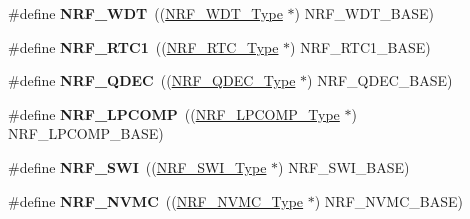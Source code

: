 \begin{DoxyCompactItemize}
\item 
\hypertarget{group___device___peripheral___registers_gae8afcbbf324cec8716a38d24de6b9220}{}\#define {\bfseries N\+R\+F\+\_\+\+W\+D\+T}~((\hyperlink{struct_n_r_f___w_d_t___type}{N\+R\+F\+\_\+\+W\+D\+T\+\_\+\+Type}            $\ast$) N\+R\+F\+\_\+\+W\+D\+T\+\_\+\+B\+A\+S\+E)\label{group___device___peripheral___registers_gae8afcbbf324cec8716a38d24de6b9220}

\item 
\hypertarget{group___device___peripheral___registers_ga5d5a8d82ac2dea6f34f24e3c01345a80}{}\#define {\bfseries N\+R\+F\+\_\+\+R\+T\+C1}~((\hyperlink{struct_n_r_f___r_t_c___type}{N\+R\+F\+\_\+\+R\+T\+C\+\_\+\+Type}            $\ast$) N\+R\+F\+\_\+\+R\+T\+C1\+\_\+\+B\+A\+S\+E)\label{group___device___peripheral___registers_ga5d5a8d82ac2dea6f34f24e3c01345a80}

\item 
\hypertarget{group___device___peripheral___registers_ga36d3e0396d97353a5d16d4d089115010}{}\#define {\bfseries N\+R\+F\+\_\+\+Q\+D\+E\+C}~((\hyperlink{struct_n_r_f___q_d_e_c___type}{N\+R\+F\+\_\+\+Q\+D\+E\+C\+\_\+\+Type}           $\ast$) N\+R\+F\+\_\+\+Q\+D\+E\+C\+\_\+\+B\+A\+S\+E)\label{group___device___peripheral___registers_ga36d3e0396d97353a5d16d4d089115010}

\item 
\hypertarget{group___device___peripheral___registers_ga1c4f6c879138b177e2c346751b252d42}{}\#define {\bfseries N\+R\+F\+\_\+\+L\+P\+C\+O\+M\+P}~((\hyperlink{struct_n_r_f___l_p_c_o_m_p___type}{N\+R\+F\+\_\+\+L\+P\+C\+O\+M\+P\+\_\+\+Type}         $\ast$) N\+R\+F\+\_\+\+L\+P\+C\+O\+M\+P\+\_\+\+B\+A\+S\+E)\label{group___device___peripheral___registers_ga1c4f6c879138b177e2c346751b252d42}

\item 
\hypertarget{group___device___peripheral___registers_ga478a13b714cb2f54618ff5b8e3fd2557}{}\#define {\bfseries N\+R\+F\+\_\+\+S\+W\+I}~((\hyperlink{struct_n_r_f___s_w_i___type}{N\+R\+F\+\_\+\+S\+W\+I\+\_\+\+Type}            $\ast$) N\+R\+F\+\_\+\+S\+W\+I\+\_\+\+B\+A\+S\+E)\label{group___device___peripheral___registers_ga478a13b714cb2f54618ff5b8e3fd2557}

\item 
\hypertarget{group___device___peripheral___registers_ga43d1bf7052746a0505eaafac83d3e279}{}\#define {\bfseries N\+R\+F\+\_\+\+N\+V\+M\+C}~((\hyperlink{struct_n_r_f___n_v_m_c___type}{N\+R\+F\+\_\+\+N\+V\+M\+C\+\_\+\+Type}           $\ast$) N\+R\+F\+\_\+\+N\+V\+M\+C\+\_\+\+B\+A\+S\+E)\label{group___device___peripheral___registers_ga43d1bf7052746a0505eaafac83d3e279}


\end{DoxyCompactItemize}
